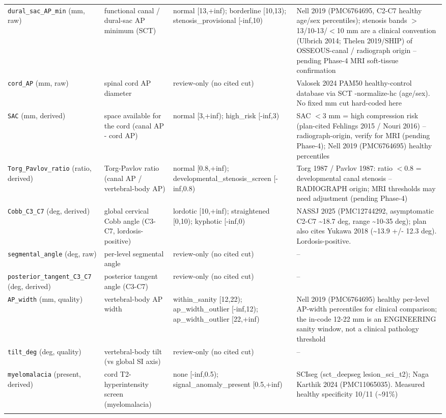 \begin{center}
\begin{longtable}{p{2.6cm} p{3.3cm} p{4.5cm} p{4.4cm}}
\addlinespace
\texttt{dural\_sac\_AP\_min} (mm, raw) & functional canal / dural-sac AP minimum (SCT) & normal [13,+inf); borderline [10,13); stenosis\_provisional [-inf,10) & Nell 2019 (PMC6764695, C2-C7 healthy age/sex percentiles); stenosis bands $>$13/10-13/$<$10 mm are a clinical convention (Ulbrich 2014; Thelen 2019/SHIP) of OSSEOUS-canal / radiograph origin -- pending Phase-4 MRI soft-tissue confirmation \\
\addlinespace
\texttt{cord\_AP} (mm, raw) & spinal cord AP diameter & review-only (no cited cut) & Valosek 2024 PAM50 healthy-control database via SCT -normalize-hc (age/sex). No fixed mm cut hard-coded here \\
\addlinespace
\texttt{SAC} (mm, derived) & space available for the cord (canal AP - cord AP) & normal [3,+inf); high\_risk [-inf,3) & SAC $<$3 mm = high compression risk (plan-cited Fehlings 2015 / Nouri 2016) -- radiograph-origin, verify for MRI (pending Phase-4); Nell 2019 (PMC6764695) healthy percentiles \\
\addlinespace
\texttt{Torg\_Pavlov\_ratio} (ratio, derived) & Torg-Pavlov ratio (canal AP / vertebral-body AP) & normal [0.8,+inf); developmental\_stenosis\_screen [-inf,0.8) & Torg 1987 / Pavlov 1987: ratio $<$0.8 = developmental canal stenosis -- RADIOGRAPH origin; MRI thresholds may need adjustment (pending Phase-4) \\
\addlinespace
\texttt{Cobb\_C3\_C7} (deg, derived) & global cervical Cobb angle (C3-C7, lordosis-positive) & lordotic [10,+inf); straightened [0,10); kyphotic [-inf,0) & NASSJ 2025 (PMC12744292, asymptomatic C2-C7 \textasciitilde{}18.7 deg, range \textasciitilde{}10-35 deg); plan also cites Yukawa 2018 (\textasciitilde{}13.9 +/- 12.3 deg). Lordosis-positive. \\
\addlinespace
\texttt{segmental\_angle} (deg, raw) & per-level segmental angle & review-only (no cited cut) & -- \\
\addlinespace
\texttt{posterior\_tangent\_C3\_C7} (deg, derived) & posterior tangent angle (C3-C7) & review-only (no cited cut) & -- \\
\addlinespace
\texttt{AP\_width} (mm, quality) & vertebral-body AP width & within\_sanity [12,22); ap\_width\_outlier [-inf,12); ap\_width\_outlier [22,+inf) & Nell 2019 (PMC6764695) healthy per-level AP-width percentiles for clinical comparison; the in-code 12-22 mm is an ENGINEERING sanity window, not a clinical pathology threshold \\
\addlinespace
\texttt{tilt\_deg} (deg, quality) & vertebral-body tilt (vs global SI axis) & review-only (no cited cut) & -- \\
\addlinespace
\texttt{myelomalacia} (present, derived) & cord T2-hyperintensity screen (myelomalacia) & none [-inf,0.5); signal\_anomaly\_present [0.5,+inf) & SCIseg (sct\_deepseg lesion\_sci\_t2); Naga Karthik 2024 (PMC11065035). Measured healthy specificity 10/11 (\textasciitilde{}91\%) \\
\addlinespace
\bottomrule
\end{longtable}
\end{center}
